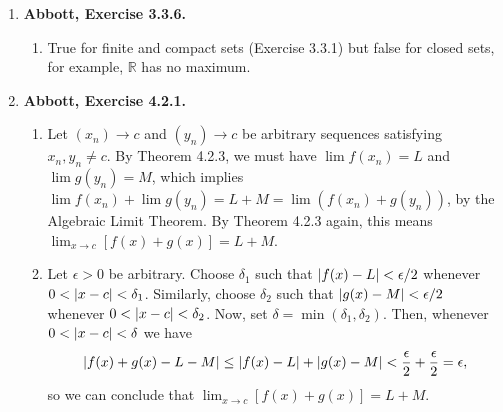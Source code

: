 \documentclass{article}
\DeclarePairedDelimiter\abs{\lvert}{\rvert}
\newcommand{\N}{\mathbb{N}}
\newcommand{\R}{\mathbb{R}}
\newcommand{\exc}[2][Abbott]{\item \textbf{#1, Exercise #2.}}
\newcommand{\lep}[1][L]{#1et $\epsilon > 0$ be arbitrary}
\begin{document}
\begin{enumerate}
\begin{enumerate}
        \item False. $[0,1] \cup [1,2] \cup [2,3] \dots$ is not bounded, therefore not compact.
        
        \item False. Let $A = (1,2)$ and $K = [0, 3]$. Then $A \cap K = (1, 2)$, which is not closed, therefore not compact.
        
        \item False. For each $n \in \N$ define 
        \begin{equation*}
            F_n = \bigcup_{k=n}^\infty [2k, 2k+1].
        \end{equation*} To see that every $F_n$ is closed, we use Theorem 3.2.8. Let $(a_n)$ be a Cauchy sequence contained in $F_n$. Then, there is some $N \in \N$ such that $\abs*{a_p-a_q} < 1/2$ for all $p, q \geq N$, thus every term of the sequence is eventually in the same interval $[2k, 2k+1]$ for some $k \geq n$. Since $[2k, 2k+1]$ is closed, the limit of $(a_n)$ is in $[2k, 2k+1]$, therefore it is also in $F_n$, so $F_n$ is closed. Now, assume the intersection $\bigcap_{n=1}^\infty F_n \neq \emptyset$. Then, there is some $x \in \R$ such that $x \in F_n$ for all $n \in N$, in particular $x \in F_1$. Then, there must be some $k \geq 1$ such that $x \in [2k, 2k+1]$. But then, $x \notin F_{k+1}$, which is a contradiction. Hence, we can conclude that $\bigcap_{n=1}^\infty F_n = \emptyset$.
    \end{enumerate}
    
    \exc{3.3.6}
    \begin{enumerate}
        \item True for finite and compact sets (Exercise 3.3.1) but false for closed sets, for example, $\R$ has no maximum.
    \end{enumerate}
    
    \exc{4.2.1}
    \begin{enumerate}
        \item Let $(x_n) \to c$ and $(y_n) \to c$ be arbitrary sequences satisfying $x_n,y_n \neq c$. By Theorem 4.2.3, we must have $\lim{f(x_n)} = L$ and 
        $\lim{g(y_n)} = M$, which implies $\lim{f(x_n)} + \lim {g(y_n)} = L + M = \lim(f(x_n) + g(y_n))$, by the Algebraic Limit Theorem. By Theorem 4.2.3 again, this means $\lim_{x \to c} [f(x)+g(x)] = L + M$.
        
        \item \lep. Choose $\delta_1$ such that $\abs*{f(x)-L} < \epsilon/2$ whenever $0 < \abs*{x-c} < \delta_1$. Similarly, choose $\delta_2$ such that $\abs*{g(x)-M} < \epsilon/2$ whenever $0 < \abs*{x-c} < \delta_2$. Now, set $\delta = \min(\delta_1, \delta_2)$. Then, whenever $0 < \abs*{x-c} < \delta$ we have
        \begin{equation*}
            \abs*{f(x)+g(x)-L-M} \leq \abs*{f(x)-L} + \abs*{g(x)-M} <
            \frac{\epsilon}{2} + \frac{\epsilon}{2} = \epsilon,
        \end{equation*} so we can conclude that $\lim_{x \to c} [f(x) + g(x)] = L + M$.
        

\end{enumerate}
\end{enumerate}
\end{document}
